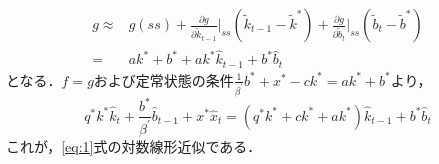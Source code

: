 \documentclass[dvipdfmx]{jlreq}
\begin{document}
\begin{itemize}
\begin{equation}
      \begin{split}
        g \approx& g(ss)
        + \frac{\partial g}{\partial \widetilde{k}_{t-1}} \bigg|_{ss} (\widetilde{k}_{t-1} - \widetilde{k}^*)
        + \frac{\partial g}{\partial \widetilde{b}_t} \bigg|_{ss} (\widetilde{b}_t - \widetilde{b}^*) \\
        =& a k^* + b^*
        + a k^* \widehat{k}_{t-1}
        + b^* \widehat{b}_t
      \end{split}
    \end{equation}
    となる．$f=g$および定常状態の条件$\frac{1}{\beta^\prime} b^* + x^* - c k^* = a k^* + b^*$より，
    \begin{equation}
      q^* k^* \widehat{k}_t + \frac{b^*}{\beta^\prime} \widehat{b}_{t-1} + x^* \widehat{x}_t
      = (q^* k^* + c k^* + a k^*) \widehat{k}_{t-1} + b^* \widehat{b}_t
    \end{equation}
    これが，\eqref{eq:1}式の対数線形近似である．
  

\end{itemize}
\end{document}
